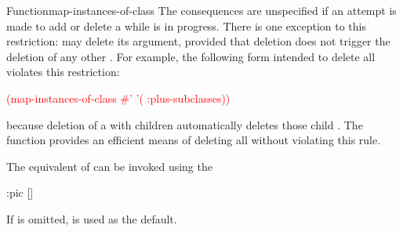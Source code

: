 \documentclass[10pt,twoside,english,pdftex]{article}
\begin{document}
\begin{functiondoc}{Function}{map-instances-of-class}
\fnnote
{}%
%
%
The consequences are unspecified if an attempt is made to add or delete a
 while  is in
progress.  There is one exception to this restriction: 
may delete its  argument, provided that deletion does not
trigger the deletion of any other .  For example, the
following form intended to delete all  violates this
restriction:
%
\W\supp
\begin{example}
   \textcolor{red}{(map-instances-of-class 
     #' 
     '( :plus-subclasses))}
\end{example}
%
because deletion of a  with children automatically
deletes those child .  The function
 provides an efficient
means of deleting all  without violating this rule.

\replnote 
%
%
%
The equivalent of 
can be invoked using the 
%
\W\supp
\begin{example}
  :pic \textrm{[}\textrm{]}
\end{example}
%
If  is omitted,  is used as the default.


\end{functiondoc}

\end{document}
